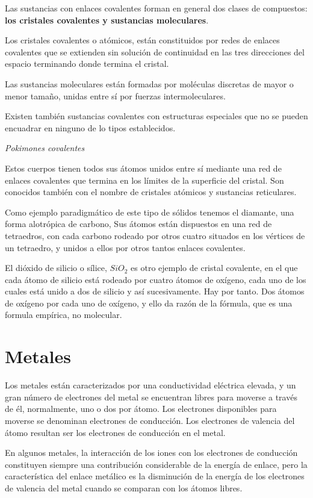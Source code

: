 \documentclass{article}
\begin{document}
Las sustancias con enlaces covalentes forman en general dos clases de compuestos: \textbf{los cristales covalentes y sustancias moleculares}. 

Los cristales covalentes o atómicos, están constituidos por redes de enlaces covalentes que se extienden sin solución de continuidad en las tres direcciones del espacio terminando donde termina el cristal.

Las sustancias moleculares están formadas por moléculas discretas de mayor o menor tamaño, unidas entre sí por fuerzas intermoleculares.

Existen también sustancias covalentes con estructuras especiales que no se pueden encuadrar en ninguno de lo tipos establecidos.

\textit{Pokimones covalentes} 

Estos cuerpos tienen todos sus átomos unidos entre sí mediante una red de enlaces covalentes que termina en los límites de la superficie del cristal. Son conocidos también con el nombre de cristales atómicos y sustancias reticulares.

Como ejemplo paradigmático de este tipo de sólidos tenemos el diamante, una forma alotrópica de carbono, Sus átomos están dispuestos en una red de tetraedros, con cada carbono rodeado por otros cuatro situados en los vértices de un tetraedro, y unidos a ellos por otros tantos enlaces covalentes.

El dióxido de silicio o sílice, $SiO_2$ es otro ejemplo de cristal covalente, en el que cada átomo de silicio está rodeado por cuatro átomos de oxígeno, cada uno de los cuales está unido a dos de silicio y así sucesivamente. Hay por tanto. Dos átomos de oxígeno por cada uno de oxígeno, y ello da razón de la fórmula, que es una formula empírica, no molecular. 


\newpage
\newpage

\section{Metales}

Los metales están caracterizados por una conductividad eléctrica elevada, y un gran número de electrones del metal se encuentran libres para moverse a través de él, normalmente, uno o dos por átomo. Los electrones disponibles para moverse se denominan electrones de conducción. Los electrones de valencia del átomo resultan ser los electrones de conducción en el metal. \cite{Kittel}

En algunos metales, la interacción de los iones con los electrones de conducción constituyen siempre una contribución considerable de la energía de enlace, pero la característica del enlace metálico es la disminución de la energía de los electrones de valencia del metal cuando se comparan con los átomos libres. 
\end{document}
